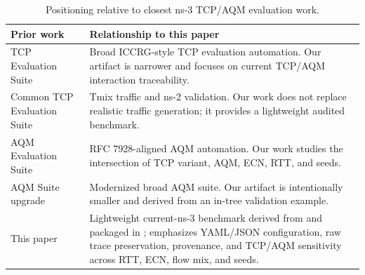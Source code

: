 \begin{table}[t]
  \caption{Positioning relative to closest ns-3 TCP/AQM evaluation work.}
  \label{tab:related-positioning}
  \begin{tabularx}{\columnwidth}{@{}p{}X@{}}
    \toprule
    Prior work & Relationship to this paper \\
    \midrule
    TCP Evaluation Suite~\cite{Mishra2016TcpEval} & Broad ICCRG-style TCP evaluation automation. Our artifact is narrower and focuses on current TCP/AQM interaction traceability. \\
    Common TCP Evaluation Suite~\cite{Nagori2017CommonTcpEval} & Tmix traffic and ns-2 validation. Our work does not replace realistic traffic generation; it provides a lightweight audited benchmark. \\
    AQM Evaluation Suite~\cite{Deepak2017AqmEval} & RFC 7928-aligned AQM automation. Our work studies the intersection of TCP variant, AQM, ECN, RTT, and seeds. \\
    AQM Suite upgrade~\cite{Ns3AppStore2025AqmEval,Lin2025GSoCAqmEval} & Modernized broad AQM suite. Our artifact is intentionally smaller and derived from an in-tree validation example. \\
    This paper & Lightweight current-ns-3 benchmark derived from \TcpValidation{} and packaged in \TcpAqmModule{}; emphasizes YAML/JSON configuration, raw trace preservation, provenance, and TCP/AQM sensitivity across RTT, ECN, flow mix, and seeds. \\
    \bottomrule
  \end{tabularx}
\end{table}
